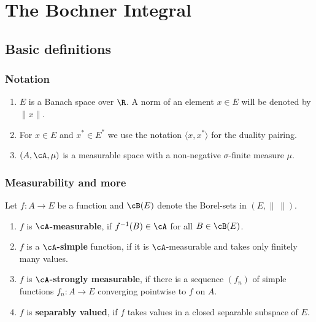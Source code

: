 
\section{The Bochner Integral}
\subsection{Basic definitions}


\begin{frame}
    \frametitle{Notation}

    \begin{enumerate}
        \item $E$ is a Banach space over $\R$. A norm of an element $x\in E$
            will be denoted by $\| x \|$.
        \item For $x\in E$ and $x^{*}\in E^{*}$ we use the notation $\langle x,x^* \rangle$
            for the duality pairing.
        \item $(A, \cA, \mu)$ is a measurable space with a non-negative 
            $\sigma$-finite measure $\mu$.
    \end{enumerate}
\end{frame}

\begin{frame}
    \frametitle{Measurability and more}
    
    Let $f: A\to E$  be a function and $\cB(E)$ denote the Borel-sets in $(E,\| \ \|)$. 
    \begin{enumerate}
        \item $f$ is \textbf{$\cA$-measurable}, if $f^{-1}(B) \in \cA$ for all
            $B \in \cB(E)$. %
        \item $f$ is a \textbf{$\cA$-simple} function, if it is $\cA$-measurable and
            takes only finitely many values. 
        \item $f$ is \textbf{$\cA$-strongly measurable}, if there is a sequence
            $(f_n)$ of simple functions $f_n : A\to E$ converging pointwise to
            $f$ on $A$.
        \item $f$ is \textbf{separably valued}, if $f$ takes values in a closed separable
            subspace of $E$. 
    \end{enumerate}
\end{frame}

